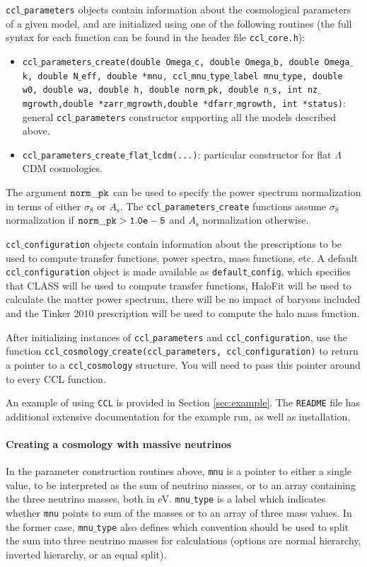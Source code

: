 \documentclass[\docopts]{\docclass}
\newcommand{\ccl}{{\tt CCL}\xspace}
\begin{document}
{\tt ccl$\_$parameters} objects contain information about the cosmological parameters of a given model, and are initialized using one of the following routines (the full syntax for each function can be found in the header file {\tt ccl$\_$core.h}):
\begin{itemize}
 \item {\tt ccl$\_$parameters$\_$create(double Omega$\_$c, double Omega$\_$b, double Omega$\_$k, double N$\_$eff, double *mnu, ccl$\_$mnu$\_$type$\_$label mnu$\_$type, double w0, double wa, double h, double norm$\_$pk, double n$\_$s, int nz$\_$mgrowth,double *zarr$\_$mgrowth,double *dfarr$\_$mgrowth, int *status)}: general {\tt ccl$\_$parameters} constructor supporting all the models described above.
 \item {\tt ccl$\_$parameters$\_$create$\_$flat$\_$lcdm(...)}: particular constructor for flat $\Lambda$CDM cosmologies.
 \end{itemize}
The argument ${\tt norm\_pk}$ can be used to specify the power spectrum normalization in terms of either $\sigma_8$ or $A_\mathrm{s}$. The {\tt ccl$\_$parameters$\_$create} functions assume $\sigma_8$ normalization if ${\tt norm\_pk > 1.0e-5}$ and $A_{\mathrm s}$ normalization otherwise.

{\tt ccl$\_$configuration} objects contain information about the prescriptions to be used to compute transfer functions, power spectra, mass functions, etc. A default {\tt ccl$\_$configuration} object is made available as {\tt default$\_$config}, which specifies that CLASS will be used to compute transfer functions, HaloFit will be used to calculate the matter power spectrum, there will be no impact of baryons included and the Tinker 2010 prescription will be used to compute the halo mass function.

After initializing instances of {\tt ccl$\_$parameters} and {\tt ccl$\_$configuration}, use the function {\tt ccl$\_$cosmology$\_$create(ccl$\_$parameters, ccl$\_$configuration)} to return a pointer to a {\tt ccl$\_$cosmology} structure. You will need to pass this pointer around to every CCL function.

An example of using \ccl is provided in Section \ref{sec:example}. The {\tt README} file has additional extensive documentation for the example run, as well as installation.

\paragraph{Creating a cosmology with massive neutrinos}
In the parameter construction routines above, {\tt mnu} is a pointer to either a single value, to be interpreted as the sum of neutrino masses, or to an array containing the three neutrino masses, both in eV. {\tt mnu$\_$type} is a label which indicates whether {\tt mnu} points to sum of the masses or to an array of three mass values. In the former case, {\tt mnu$\_$type} also defines which convention should be used to split the sum into three neutrino masses for calculations (options are normal hierarchy, inverted hierarchy, or an equal split).
\end{document}
